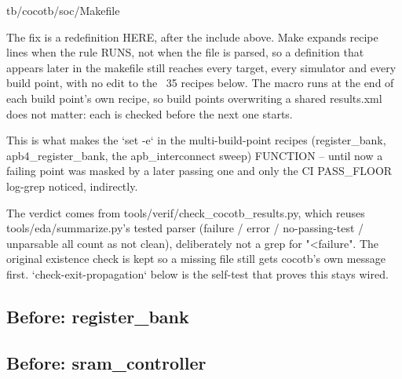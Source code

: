 \begin{relocated}{tb/cocotb/soc/Makefile}
\begin{textblock}
The fix is a redefinition HERE, after the include above.  Make expands recipe lines when
the rule RUNS, not when the file is parsed, so a definition that appears later in the
makefile still reaches every target, every simulator and every build point, with no edit
to the ~35 recipes below.  The macro runs at the end of each build point's own recipe, so
build points overwriting a shared results.xml does not matter: each is checked before the
next one starts.

This is what makes the `set -e` in the multi-build-point recipes (register_bank,
apb4_register_bank, the apb_interconnect sweep) FUNCTION -- until now a failing point was
masked by a later passing one and only the CI PASS_FLOOR log-grep noticed, indirectly.

The verdict comes from tools/verif/check_cocotb_results.py, which reuses
tools/eda/summarize.py's tested parser (failure / error / no-passing-test / unparsable
all count as not clean), deliberately not a grep for "<failure".  The original existence
check is kept so a missing file still gets cocotb's own message first.
`check-exit-propagation` below is the self-test that proves this stays wired.
\end{textblock}

\subsection*{Before: register\_bank}


\subsection*{Before: sram\_controller}


\end{relocated}
